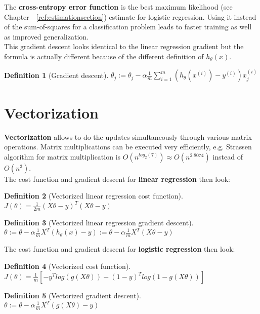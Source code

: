 \documentclass{report}
\newtheorem{definition}{Definition}[section]
\begin{document}
The {\bf cross-entropy error function} is the best maximum likelihood (see Chapter~~\ref{ref:estimationsection}) estimate for logistic regression.
Using it instead of the sum-of-squares for a classification problem leads to faster training as well as improved generalization.
\\
This gradient descent looks identical to the linear regression gradient but the formula is actually different because of the different definition of $h_{\theta}(x)$.
\begin{definition}[Gradient descent]
$\theta_j := \theta_j - \alpha \frac{1}{m}\sum_{i=1}^m(h_\theta(x^{(i)})-y^{(i)})x_j^{(i)}$
\end{definition}


\section{Vectorization}
\label{chapter:vectorization}
{\bf Vectorization} allows to do the updates simultaneously through various matrix operations.
Matrix multiplications can be executed very efficiently, e.g. Strassen algorithm for matrix multiplication is $O(n^{log_2(7)})\approx O(n^{2.8074})$ instead of $O(n^3)$.
\\
The cost function and gradient descent for {\bf linear regression} then look:

\begin{definition}[Vectorized linear regression cost function] ~\\
$J(\theta) = \frac{1}{2m}(X\theta-y)^T(X\theta-y)$
\end{definition}

\begin{definition}[Vectorized linear regression gradient descent] ~\\
$\theta := \theta - \alpha \frac{1}{m}X^{T}(h_{\theta}(x)-y) := \theta - \alpha \frac{1}{m}X^{T}(X\theta-y)$
\end{definition}

The cost function and gradient descent for {\bf logistic regression} then look:
\begin{definition}[Vectorized cost function] ~\\
$J(\theta) = \frac{1}{m}[-y^T log(g(X\theta))-(1-y)^T log(1-g(X\theta))]$
\end{definition}

\begin{definition}[Vectorized gradient descent] ~\\
$\theta := \theta - \alpha \frac{1}{m}X^{T}(g(X\theta)-y)$
\end{definition}
\end{document}
